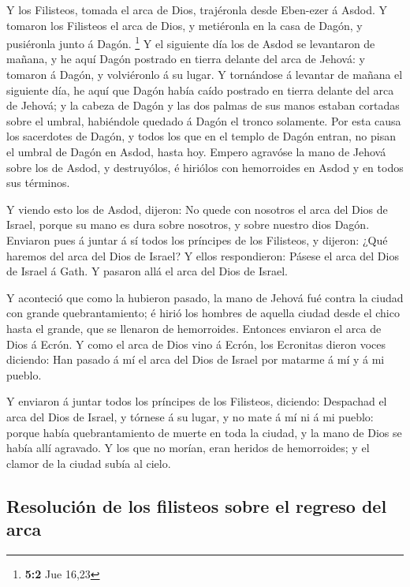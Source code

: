  Y los Filisteos, tomada el arca de Dios, trajéronla desde
Eben-ezer á Asdod.  Y tomaron los Filisteos el arca de
Dios, y metiéronla en la casa de Dagón, y pusiéronla junto á Dagón.
\footnote{\textbf{5:2} Jue 16,23}  Y el siguiente día los
de Asdod se levantaron de mañana, y he aquí Dagón postrado en tierra
delante del arca de Jehová: y tomaron á Dagón, y volviéronlo á su lugar.
 Y tornándose á levantar de mañana el siguiente día, he
aquí que Dagón había caído postrado en tierra delante del arca de
Jehová; y la cabeza de Dagón y las dos palmas de sus manos estaban
cortadas sobre el umbral, habiéndole quedado á Dagón el tronco
solamente.  Por esta causa los sacerdotes de Dagón, y
todos los que en el templo de Dagón entran, no pisan el umbral de Dagón
en Asdod, hasta hoy.  Empero agravóse la mano de Jehová
sobre los de Asdod, y destruyólos, é hiriólos con hemorroides en Asdod y
en todos sus términos.

 Y viendo esto los de Asdod, dijeron: No quede con
nosotros el arca del Dios de Israel, porque su mano es dura sobre
nosotros, y sobre nuestro dios Dagón.  Enviaron pues á
juntar á sí todos los príncipes de los Filisteos, y dijeron: ¿Qué
haremos del arca del Dios de Israel? Y ellos respondieron: Pásese el
arca del Dios de Israel á Gath. Y pasaron allá el arca del Dios de
Israel.

 Y aconteció que como la hubieron pasado, la mano de
Jehová fué contra la ciudad con grande quebrantamiento; é hirió los
hombres de aquella ciudad desde el chico hasta el grande, que se
llenaron de hemorroides.  Entonces enviaron el arca de
Dios á Ecrón. Y como el arca de Dios vino á Ecrón, los Ecronitas dieron
voces diciendo: Han pasado á mí el arca del Dios de Israel por matarme á
mí y á mi pueblo.

 Y enviaron á juntar todos los príncipes de los
Filisteos, diciendo: Despachad el arca del Dios de Israel, y tórnese á
su lugar, y no mate á mí ni á mi pueblo: porque había quebrantamiento de
muerte en toda la ciudad, y la mano de Dios se había allí agravado.
 Y los que no morían, eran heridos de hemorroides; y el
clamor de la ciudad subía al cielo.

\hypertarget{resoluciuxf3n-de-los-filisteos-sobre-el-regreso-del-arca}{%
\subsection{Resolución de los filisteos sobre el regreso del
arca}\label{resoluciuxf3n-de-los-filisteos-sobre-el-regreso-del-arca}}

